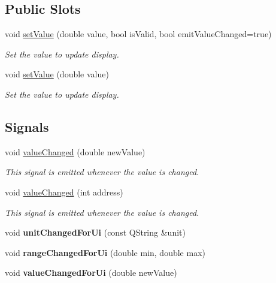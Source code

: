 \subsection*{Public Slots}
\begin{DoxyCompactItemize}
\item 
void \hyperlink{classmdt_analog_io_ac83abbda2bafce5c02e3ae1dbc5e2555}{setValue} (double value, bool isValid, bool emitValueChanged=true)
\begin{DoxyCompactList}\small\item\em Set the value to update display. \end{DoxyCompactList}\item 
void \hyperlink{classmdt_analog_io_a9729875cb13fa2069e40c9abce914870}{setValue} (double value)
\begin{DoxyCompactList}\small\item\em Set the value to update display. \end{DoxyCompactList}\end{DoxyCompactItemize}
\subsection*{Signals}
\begin{DoxyCompactItemize}
\item 
\hypertarget{classmdt_analog_io_ad658090469cc6b69fa92d9bca73d8a16}{
void \hyperlink{classmdt_analog_io_ad658090469cc6b69fa92d9bca73d8a16}{valueChanged} (double newValue)}
\label{classmdt_analog_io_ad658090469cc6b69fa92d9bca73d8a16}

\begin{DoxyCompactList}\small\item\em This signal is emitted whenever the value is changed. \end{DoxyCompactList}\item 
void \hyperlink{classmdt_analog_io_ad80031d8be66c05085fb5df651d421ef}{valueChanged} (int address)
\begin{DoxyCompactList}\small\item\em This signal is emitted whenever the value is changed. \end{DoxyCompactList}\item 
\hypertarget{classmdt_analog_io_aa81b49605f601850ecfa780f2b758e98}{
void {\bfseries unitChangedForUi} (const QString \&unit)}
\label{classmdt_analog_io_aa81b49605f601850ecfa780f2b758e98}

\item 
\hypertarget{classmdt_analog_io_a40735cbbf852790067a6f9b57aac4aa3}{
void {\bfseries rangeChangedForUi} (double min, double max)}
\label{classmdt_analog_io_a40735cbbf852790067a6f9b57aac4aa3}

\item 
\hypertarget{classmdt_analog_io_aaef16a200f5a862356eaeb4a65a1e06f}{
void {\bfseries valueChangedForUi} (double newValue)}
\label{classmdt_analog_io_aaef16a200f5a862356eaeb4a65a1e06f}

\end{DoxyCompactItemize}

